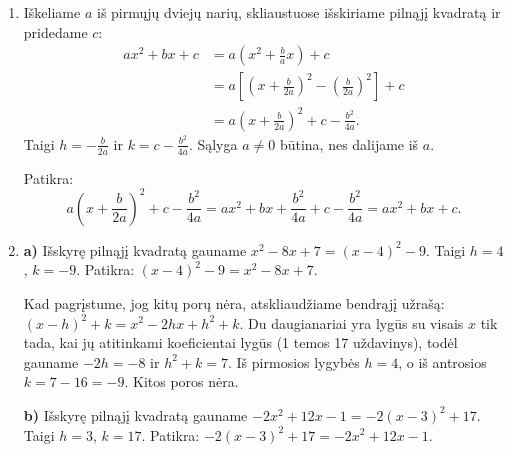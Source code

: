 \documentclass[12pt,a4paper]{article}
\begin{document}
\begin{enumerate}
\textbf{o)} Kai $a\ne0$,
\[
ax^2+2x+1=a\left(x^2+\frac2a x\right)+1
=a\left[\left(x+\frac1a\right)^2-\frac1{a^2}\right]+1
=a\left(x+\frac1a\right)^2+1-\frac1a.
\]
\textbf{p)}
\[
3x^2+bx-2=3\left(x^2+\frac b3x\right)-2
=3\left[\left(x+\frac b6\right)^2-\frac{b^2}{36}\right]-2
=3\left(x+\frac b6\right)^2-2-\frac{b^2}{12}.
\]
\textbf{q)} Kai $a\ne0$,
\[
ax^2-5x+c=a\left(x^2-\frac5a x\right)+c
=a\left[\left(x-\frac5{2a}\right)^2-\frac{25}{4a^2}\right]+c
=a\left(x-\frac5{2a}\right)^2+c-\frac{25}{4a}.
\]
\textbf{r)}
\[
-2x^2+bx+c=-2\left(x^2-\frac b2x\right)+c
=-2\left[\left(x-\frac b4\right)^2-\frac{b^2}{16}\right]+c
=-2\left(x-\frac b4\right)^2+c+\frac{b^2}{8}.
\]
\textbf{s)}
\[
4x^2-3x+c=4\left(x^2-\frac34x\right)+c
=4\left[\left(x-\frac38\right)^2-\frac9{64}\right]+c
=4\left(x-\frac38\right)^2+c-\frac9{16}.
\]
\textbf{t)} Kai $a\ne0$,
\[
ax^2+bx+1=a\left(x^2+\frac ba x\right)+1
=a\left[\left(x+\frac b{2a}\right)^2-\frac{b^2}{4a^2}\right]+1
=a\left(x+\frac b{2a}\right)^2+1-\frac{b^2}{4a}.
\]
Patikra atliekama atskliaudžiant. Pavyzdžiui,
\[
-2\left(x-\frac b4\right)^2+c+\frac{b^2}{8}
=-2x^2+bx-\frac{b^2}{8}+c+\frac{b^2}{8}=-2x^2+bx+c.
\]
\item Iškeliame $a$ iš pirmųjų dviejų narių, skliaustuose išskiriame pilnąjį kvadratą ir pridedame $c$:
\[
\begin{aligned}
ax^2+bx+c&=a\left(x^2+\frac ba x\right)+c\\
&=a\left[\left(x+\frac b{2a}\right)^2-\left(\frac b{2a}\right)^2\right]+c\\
&=a\left(x+\frac b{2a}\right)^2+c-\frac{b^2}{4a}.
\end{aligned}
\]
Taigi $h=-\frac b{2a}$ ir $k=c-\frac{b^2}{4a}$. Sąlyga $a\ne0$ būtina, nes dalijame iš $a$.

Patikra:
\[
a\left(x+\frac b{2a}\right)^2+c-\frac{b^2}{4a}
=ax^2+bx+\frac{b^2}{4a}+c-\frac{b^2}{4a}=ax^2+bx+c.
\]
\item \textbf{a)} Išskyrę pilnąjį kvadratą gauname $x^2-8x+7=(x-4)^2-9$. Taigi $h=4$, $k=-9$. Patikra: $(x-4)^2-9=x^2-8x+7$.

Kad pagrįstume, jog kitų porų nėra, atskliaudžiame bendrąjį užrašą: $(x-h)^2+k=x^2-2hx+h^2+k$. Du daugianariai yra lygūs su visais $x$ tik tada, kai jų atitinkami koeficientai lygūs (1 temos 17 uždavinys), todėl gauname $-2h=-8$ ir $h^2+k=7$. Iš pirmosios lygybės $h=4$, o iš antrosios $k=7-16=-9$. Kitos poros nėra.

\textbf{b)} Išskyrę pilnąjį kvadratą gauname $-2x^2+12x-1=-2(x-3)^2+17$. Taigi $h=3$, $k=17$. Patikra: $-2(x-3)^2+17=-2x^2+12x-1$.


\end{enumerate}
\end{document}
